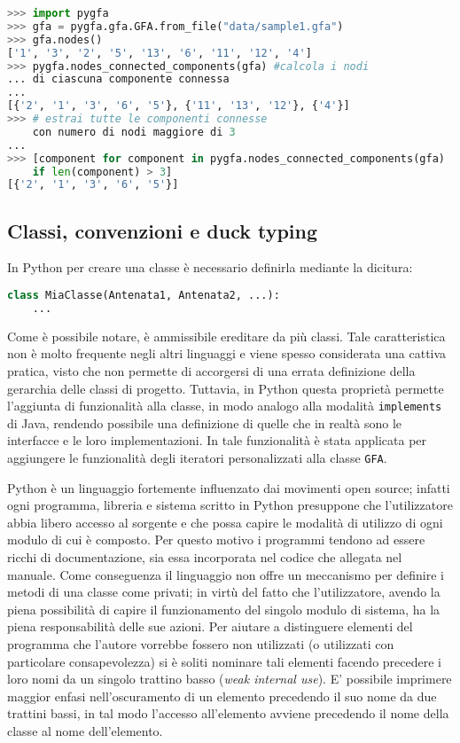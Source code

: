 \captionsetup{justification=centering, singlelinecheck=false}
\begin{lstlisting}[language=Python, frame=topline, caption=Un esempio  dell'espressività\\del linguaggio applicata a \pygfa.]
>>> import pygfa
>>> gfa = pygfa.gfa.GFA.from_file("data/sample1.gfa")
>>> gfa.nodes()
['1', '3', '2', '5', '13', '6', '11', '12', '4']
>>> pygfa.nodes_connected_components(gfa) #calcola i nodi
...	di ciascuna componente connessa
...
[{'2', '1', '3', '6', '5'}, {'11', '13', '12'}, {'4'}]
>>> # estrai tutte le componenti connesse
	con numero di nodi maggiore di 3
...
>>> [component for component in pygfa.nodes_connected_components(gfa)
	if len(component) > 3]
[{'2', '1', '3', '6', '5'}]
\end{lstlisting}
\captionsetup{justification=justified, singlelinecheck=false}

\subsection{Classi, convenzioni e duck typing}
In Python per creare una classe è necessario definirla mediante
la dicitura:
\begin{lstlisting}[language=Python]
class MiaClasse(Antenata1, Antenata2, ...):
	...
\end{lstlisting}
Come è possibile notare, è ammissibile ereditare da più classi.
Tale caratteristica non è molto frequente negli altri linguaggi e
viene spesso considerata una cattiva pratica, visto che non
permette di accorgersi di una errata definizione della gerarchia delle
classi di progetto. Tuttavia, in Python questa proprietà permette
l'aggiunta di funzionalità alla classe, in modo analogo alla modalità
\texttt{implements} di Java, rendendo possibile una definizione di
quelle che in realtà sono le interfacce e le loro implementazioni.
In \pygfa tale funzionalità è stata applicata per aggiungere le
funzionalità degli iteratori personalizzati alla classe \texttt{GFA}.

Python è un linguaggio fortemente influenzato dai movimenti
open source; infatti ogni programma, libreria e sistema scritto in Python
presuppone che l'utilizzatore abbia libero accesso al sorgente e che
possa capire le modalità di utilizzo di ogni modulo di cui è composto.
Per questo motivo i programmi tendono ad essere ricchi di documentazione,
sia essa incorporata nel codice che allegata nel manuale.
Come conseguenza il linguaggio non offre un meccanismo per definire i
metodi di una classe come privati; in virtù del fatto che l'utilizzatore, avendo
la piena possibilità di capire il funzionamento del singolo modulo di sistema,
ha la piena responsabilità delle sue azioni.
Per aiutare a distinguere elementi del programma che l'autore vorrebbe
fossero non utilizzati (o utilizzati con particolare consapevolezza) si è
soliti nominare tali elementi facendo precedere i loro nomi da un singolo
trattino basso (\emph{weak internal use}). E' possibile imprimere
maggior enfasi nell'oscuramento di un elemento precedendo
il suo nome da due trattini bassi, in tal modo l'accesso
all'elemento avviene precedendo il nome della classe al nome dell'elemento.

